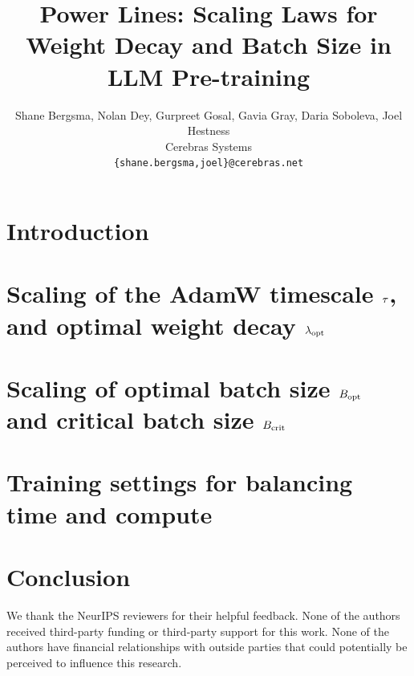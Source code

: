 \documentclass{article}
\title{Power Lines: Scaling Laws for Weight Decay and Batch Size in LLM Pre-training}
\author{Shane Bergsma, Nolan Dey, Gurpreet Gosal, Gavia Gray, Daria Soboleva, Joel Hestness \\
  Cerebras Systems \\
  \texttt{\{shane.bergsma,joel\}@cerebras.net}
}
\begin{document}
\maketitle

\begin{abstract}

\end{abstract}



\section{Introduction}\label{sec:intro}


\section{Scaling of the AdamW timescale $\tau$, and optimal weight decay $\lambda_{\text{opt}}$}\label{sec:lambda}


\section{Scaling of optimal batch size $B_{\text{opt}}$ and critical batch size $B_{\text{crit}}$}\label{sec:bcrit}


\section{Training settings for balancing time and compute}\label{sec:balancing}


\section{Conclusion}\label{sec:conclusion}



\begin{ack}
  We thank the NeurIPS reviewers for their helpful feedback.  None of
  the authors received third-party funding or third-party support for
  this work.  None of the authors have financial relationships with
  outside parties that could potentially be perceived to influence
  this research.
\end{ack}



%



\newpage
\appendix



%
\end{document}
